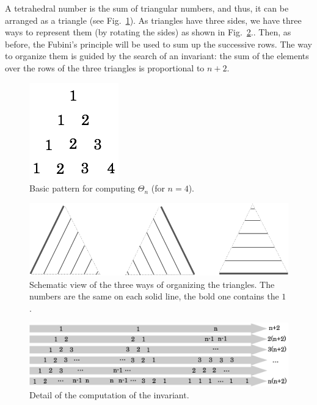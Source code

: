 A tetrahedral number is the sum of triangular numbers, and thus, it can be arranged as a triangle (see Fig.~\ref{fig:Tetrahedral3}).
As triangles have three sides, we have three ways to represent them (by rotating the sides) as shown in Fig.~\ref{fig:Tetrahedral1}..
Then, as before, the Fubini's principle will be used to sum up the successive rows.
The way to organize them is guided by the search of an invariant:
the sum of the elements over the rows of the three triangles is proportional to $n+2$.
\begin{figure}[h]
\begin{center}
        \includegraphics[scale=0.4]{FiguresArithmetic/appTetrahedral3}
        \caption{Basic pattern for computing $\Theta_n$ (for $n=4$).}
        \label{fig:Tetrahedral3}
\end{center}
\end{figure}
\begin{figure}[h]
\begin{center}
        \includegraphics[scale=0.3]{FiguresArithmetic/appTetrahedral1}
        \caption{Schematic view of the three ways of organizing the triangles.
        The numbers are the same on each solid line, the bold one contains the $1$.}
        \label{fig:Tetrahedral1}
\end{center}
\end{figure}
\begin{figure}[h]
\begin{center}
        \includegraphics[scale=0.32]{FiguresArithmetic/appTetrahedral4}
        \caption{Detail of the computation of the invariant.}
        \label{fig:Tetrahedral4}
\end{center}
\end{figure}
